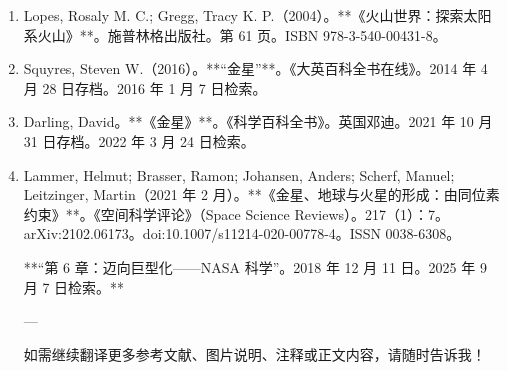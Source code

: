 \begin{enumerate}
\item Lopes, Rosaly M. C.; Gregg, Tracy K. P.（2004）。**《火山世界：探索太阳系火山》**。施普林格出版社。第 61 页。ISBN 978-3-540-00431-8。

\item Squyres, Steven W.（2016）。**“金星”**。《大英百科全书在线》。2014 年 4 月 28 日存档。2016 年 1 月 7 日检索。

\item Darling, David。**《金星》**。《科学百科全书》。英国邓迪。2021 年 10 月 31 日存档。2022 年 3 月 24 日检索。

\item Lammer, Helmut; Brasser, Ramon; Johansen, Anders; Scherf, Manuel; Leitzinger, Martin（2021 年 2 月）。**《金星、地球与火星的形成：由同位素约束》**。《空间科学评论》（Space Science Reviews）。217（1）：7。arXiv:2102.06173。doi:10.1007/s11214-020-00778-4。ISSN 0038-6308。

**“第 6 章：迈向巨型化——NASA 科学”。2018 年 12 月 11 日。2025 年 9 月 7 日检索。**

---

如需继续翻译更多参考文献、图片说明、注释或正文内容，请随时告诉我！

\end{enumerate}